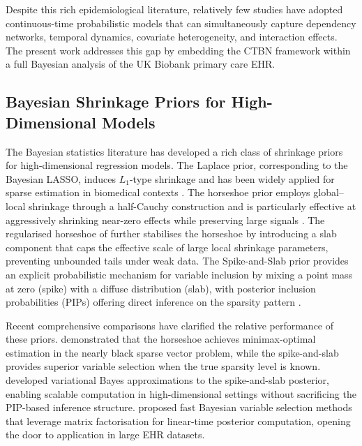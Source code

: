 \documentclass[12pt]{article}
\begin{document}
Despite this rich epidemiological literature, relatively few studies have
adopted continuous-time probabilistic models that can simultaneously capture
dependency networks, temporal dynamics, covariate heterogeneity, and
interaction effects.  The present work addresses this gap by embedding the
CTBN framework within a full Bayesian analysis of the UK Biobank primary care
EHR.

\subsection{Bayesian Shrinkage Priors for High-Dimensional Models}

The Bayesian statistics literature has developed a rich class of shrinkage
priors for high-dimensional regression models.  The Laplace prior,
corresponding to the Bayesian LASSO, induces $L_1$-type shrinkage and has
been widely applied for sparse estimation in biomedical contexts
\citep{park2008bayesian, ParkCasella2008}.  The horseshoe prior employs
global--local shrinkage through a half-Cauchy construction and is particularly
effective at aggressively shrinking near-zero effects while preserving large
signals \citep{carvalho2010horseshoe, Carvalho2010}.  The regularised horseshoe
of \citet{piironen2017sparsity, PiironenVehtari2017} further stabilises the
horseshoe by introducing a slab component that caps the effective scale of
large local shrinkage parameters, preventing unbounded tails under weak data.
The Spike-and-Slab prior \citep{MitchellBeauchamp1988, GeorgeMcCulloch1993}
provides an explicit probabilistic mechanism for variable inclusion by mixing
a point mass at zero (spike) with a diffuse distribution (slab), with posterior
inclusion probabilities (PIPs) offering direct inference on the sparsity pattern
\citep{rovckova2018spike, BarbieriBerger2004}.

Recent comprehensive comparisons have clarified the relative performance of
these priors.  \citet{bhadra2019lasso} demonstrated that the horseshoe
achieves minimax-optimal estimation in the nearly black sparse vector problem,
while the spike-and-slab provides superior variable selection when the true
sparsity level is known.  \citet{ray2022variational} developed variational
Bayes approximations to the spike-and-slab posterior, enabling scalable
computation in high-dimensional settings without sacrificing the PIP-based
inference structure.  \citet{kowal2023fast} proposed fast Bayesian variable
selection methods that leverage matrix factorisation for linear-time posterior
computation, opening the door to application in large EHR datasets.
\end{document}
